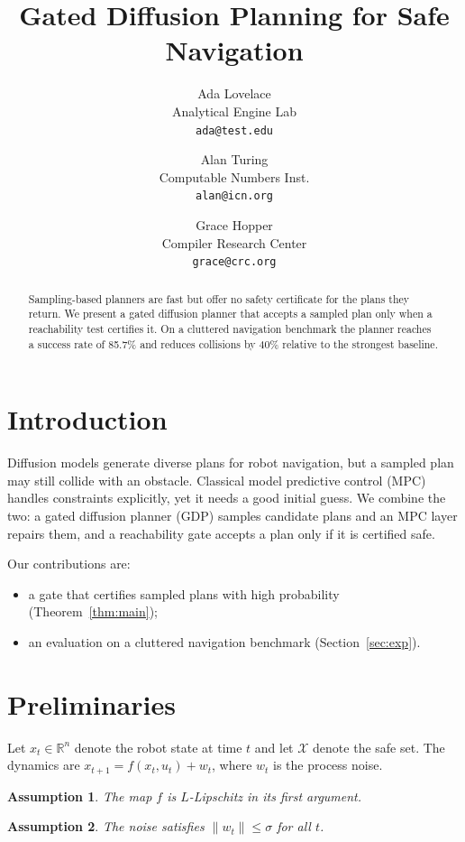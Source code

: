 \documentclass[letterpaper,10pt]{article}
\title{Gated Diffusion Planning for Safe Navigation}
\author{Ada Lovelace\\Analytical Engine Lab\\\texttt{ada@test.edu}
  \and Alan Turing\\Computable Numbers Inst.\\\texttt{alan@icn.org}
  \and Grace Hopper\\Compiler Research Center\\\texttt{grace@crc.org}}
\newtheorem{assumption}{Assumption}
\begin{document}
\maketitle

\begin{abstract}
Sampling-based planners are fast but offer no safety certificate for the plans they return.
We present a gated diffusion planner that accepts a sampled plan only when a reachability test
certifies it. On a cluttered navigation benchmark the planner reaches a success rate of
85.7\% and reduces collisions by 40\% relative to the strongest baseline.
\end{abstract}

\section{Introduction}\label{sec:intro}
Diffusion models generate diverse plans for robot navigation, but a sampled plan may still
collide with an obstacle. Classical model predictive control (MPC) handles constraints
explicitly, yet it needs a good initial guess. We combine the two: a gated diffusion planner
(GDP) samples candidate plans and an MPC layer repairs them, and a reachability gate accepts
a plan only if it is certified safe.

Our contributions are:
\begin{itemize}
  \item a gate that certifies sampled plans with high probability (Theorem~\ref{thm:main});
  \item an evaluation on a cluttered navigation benchmark (Section~\ref{sec:exp}).
\end{itemize}

\section{Preliminaries}\label{sec:prelim}
Let $x_t \in \mathbb{R}^n$ denote the robot state at time $t$ and let $\mathcal{X}$ denote the
safe set. The dynamics are $x_{t+1} = f(x_t, u_t) + w_t$, where $w_t$ is the process noise.

\begin{assumption}\label{asm:lip}
The map $f$ is $L$-Lipschitz in its first argument.
\end{assumption}

\begin{assumption}\label{asm:noise}
The noise satisfies $\|w_t\| \le \sigma$ for all $t$.
\end{assumption}
\end{document}
